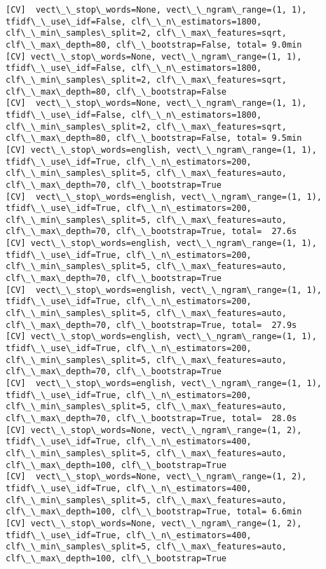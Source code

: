\documentclass[11pt]{article}
\begin{document}
\begin{Verbatim}[commandchars=\\\{\}]
[CV]  vect\_\_stop\_words=None, vect\_\_ngram\_range=(1, 1), tfidf\_\_use\_idf=False, clf\_\_n\_estimators=1800, clf\_\_min\_samples\_split=2, clf\_\_max\_features=sqrt, clf\_\_max\_depth=80, clf\_\_bootstrap=False, total= 9.0min
[CV] vect\_\_stop\_words=None, vect\_\_ngram\_range=(1, 1), tfidf\_\_use\_idf=False, clf\_\_n\_estimators=1800, clf\_\_min\_samples\_split=2, clf\_\_max\_features=sqrt, clf\_\_max\_depth=80, clf\_\_bootstrap=False 
[CV]  vect\_\_stop\_words=None, vect\_\_ngram\_range=(1, 1), tfidf\_\_use\_idf=False, clf\_\_n\_estimators=1800, clf\_\_min\_samples\_split=2, clf\_\_max\_features=sqrt, clf\_\_max\_depth=80, clf\_\_bootstrap=False, total= 9.5min
[CV] vect\_\_stop\_words=english, vect\_\_ngram\_range=(1, 1), tfidf\_\_use\_idf=True, clf\_\_n\_estimators=200, clf\_\_min\_samples\_split=5, clf\_\_max\_features=auto, clf\_\_max\_depth=70, clf\_\_bootstrap=True 
[CV]  vect\_\_stop\_words=english, vect\_\_ngram\_range=(1, 1), tfidf\_\_use\_idf=True, clf\_\_n\_estimators=200, clf\_\_min\_samples\_split=5, clf\_\_max\_features=auto, clf\_\_max\_depth=70, clf\_\_bootstrap=True, total=  27.6s
[CV] vect\_\_stop\_words=english, vect\_\_ngram\_range=(1, 1), tfidf\_\_use\_idf=True, clf\_\_n\_estimators=200, clf\_\_min\_samples\_split=5, clf\_\_max\_features=auto, clf\_\_max\_depth=70, clf\_\_bootstrap=True 
[CV]  vect\_\_stop\_words=english, vect\_\_ngram\_range=(1, 1), tfidf\_\_use\_idf=True, clf\_\_n\_estimators=200, clf\_\_min\_samples\_split=5, clf\_\_max\_features=auto, clf\_\_max\_depth=70, clf\_\_bootstrap=True, total=  27.9s
[CV] vect\_\_stop\_words=english, vect\_\_ngram\_range=(1, 1), tfidf\_\_use\_idf=True, clf\_\_n\_estimators=200, clf\_\_min\_samples\_split=5, clf\_\_max\_features=auto, clf\_\_max\_depth=70, clf\_\_bootstrap=True 
[CV]  vect\_\_stop\_words=english, vect\_\_ngram\_range=(1, 1), tfidf\_\_use\_idf=True, clf\_\_n\_estimators=200, clf\_\_min\_samples\_split=5, clf\_\_max\_features=auto, clf\_\_max\_depth=70, clf\_\_bootstrap=True, total=  28.0s
[CV] vect\_\_stop\_words=None, vect\_\_ngram\_range=(1, 2), tfidf\_\_use\_idf=True, clf\_\_n\_estimators=400, clf\_\_min\_samples\_split=5, clf\_\_max\_features=auto, clf\_\_max\_depth=100, clf\_\_bootstrap=True 
[CV]  vect\_\_stop\_words=None, vect\_\_ngram\_range=(1, 2), tfidf\_\_use\_idf=True, clf\_\_n\_estimators=400, clf\_\_min\_samples\_split=5, clf\_\_max\_features=auto, clf\_\_max\_depth=100, clf\_\_bootstrap=True, total= 6.6min
[CV] vect\_\_stop\_words=None, vect\_\_ngram\_range=(1, 2), tfidf\_\_use\_idf=True, clf\_\_n\_estimators=400, clf\_\_min\_samples\_split=5, clf\_\_max\_features=auto, clf\_\_max\_depth=100, clf\_\_bootstrap=True 

\end{Verbatim}
\end{document}
